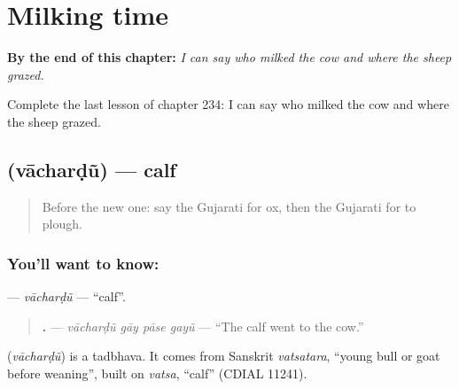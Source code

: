 
\chapter{Milking time}
\label{ch:gu-milking-time}

\begin{chapteropening}
\textbf{By the end of this chapter:} \emph{I can say who milked the cow and where the sheep grazed.}

Complete the last lesson of chapter 234: I can say who milked the cow and where the sheep grazed.
\end{chapteropening}

\section[\texorpdfstring{\gu{વાછરડું} (vācharḍũ)}{વાછરડું (vācharḍũ)}]{ (vācharḍũ) — calf}

\label{lesson:GU-C234-vachardu}



\begin{quote}
Before the new one: say the Gujarati for ox, then the Gujarati for to plough.
\end{quote}

\subsection*{You'll want to know: }
\textbf{} — \emph{vācharḍũ} — \textquotedblleft{}calf\textquotedblright{}.

\begin{quote}
\textbf{   .} — \emph{vācharḍũ gāy pāse gayũ} — \textquotedblleft{}The calf went to the cow.\textquotedblright{}
\end{quote}

\begin{cousinweb}
\textbf{} (\emph{vācharḍũ}) is a tadbhava. It comes from Sanskrit \emph{vatsatara}, \textquotedblleft{}young bull or goat before weaning\textquotedblright{}, built on \emph{vatsa}, \textquotedblleft{}calf\textquotedblright{} (CDIAL 11241).
\end{cousinweb}

